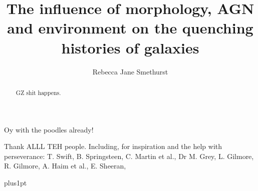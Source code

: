 \documentclass[12pt,useAMS]{ociamthesis}  %
\title{The influence of morphology, AGN and environment on the quenching histories of galaxies}   %
\author{Rebecca Jane Smethurst}             %
\begin{document}
 
\setcounter{secnumdepth}{3}
\setcounter{tocdepth}{3}


\maketitle                  %

\begin{dedication}
Oy with the poodles already!
\end{dedication}

\begin{acknowledgements}
Thank ALLL TEH people. 
Including, for inspiration and the help with perseverance: T. Swift, B. Springsteen, C. Martin et al., Dr M. Grey, L. Gilmore, R. Gilmore, A. Haim et al., E. Sheeran, 

\end{acknowledgements}

\begin{abstract}  
GZ shit happens.         %
\end{abstract}

\begin{romanpages}          %
\tableofcontents            %
\listoffigures              %
\end{romanpages}            %


\baselineskip=18pt plus1pt
\linespread{1.2}
 \setlength{\parskip}{1em}
 










\end{document}
